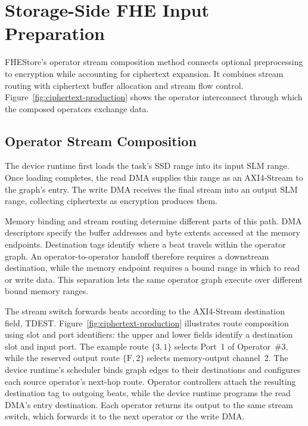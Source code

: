 \documentclass[sigconf,anonymous,balance=false]{acmart}
\newcommand{\bodypar}{\par\vskip 0pt plus 6pt\relax}
\begin{document}
\section{Storage-Side FHE Input Preparation}
\label{sec:production}

FHEStore's operator stream composition method connects optional preprocessing to encryption while accounting for ciphertext expansion. It combines stream routing with ciphertext buffer allocation and stream flow control. Figure~\ref{fig:ciphertext-production} shows the operator interconnect through which the composed operators exchange data.

\subsection{Operator Stream Composition}
\label{subsec:streaming-production}

The device runtime first loads the task's SSD range into its input SLM range. Once loading completes, the read DMA supplies this range as an AXI4-Stream to the graph's entry. The write DMA receives the final stream into an output SLM range, collecting ciphertexts as encryption produces them.
\bodypar

Memory binding and stream routing determine different parts of this path. DMA descriptors specify the buffer addresses and byte extents accessed at the memory endpoints. Destination tags identify where a beat travels within the operator graph. An operator-to-operator handoff therefore requires a downstream destination, while the memory endpoint requires a bound range in which to read or write data. This separation lets the same operator graph execute over different bound memory ranges.
\bodypar

The stream switch forwards beats according to the AXI4-Stream destination field, TDEST. Figure~\ref{fig:ciphertext-production} illustrates route composition using slot and port identifiers: the upper and lower fields identify a destination slot and input port. The example route $\{3,1\}$ selects Port~1 of Operator~\#3, while the reserved output route $\{\mathrm{F},2\}$ selects memory-output channel~2. The device runtime's scheduler binds graph edges to their destinations and configures each source operator's next-hop route. Operator controllers attach the resulting destination tag to outgoing beats, while the device runtime programs the read DMA's entry destination. Each operator returns its output to the same stream switch, which forwards it to the next operator or the write DMA.
\bodypar
\end{document}
